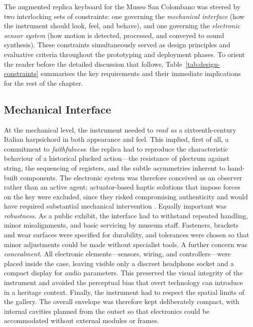 The augmented replica keyboard for the Museo San Colombano was steered by two interlocking sets of constraints: one governing the \emph{mechanical interface} (how the instrument should look, feel, and behave), and one governing the \emph{electronic sensor system} (how motion is detected, processed, and conveyed to sound synthesis). These constraints simultaneously served as design principles and evaluative criteria throughout the prototyping and deployment phases. To orient the reader before the detailed discussion that follows, Table~\ref{tab:design-constraints} summarises the key requirements and their immediate implications for the rest of the chapter.

\subsection{Mechanical Interface}

At the mechanical level, the instrument needed to \emph{read as} a sixteenth-century Italian harpsichord in both appearance and feel. This implied, first of all, a commitment to \emph{faithfulness}: the replica had to reproduce the characteristic behaviour of a historical plucked action---the resistance of plectrum against string, the sequencing of registers, and the subtle asymmetries inherent to hand-built components. The electronic system was therefore conceived as an observer rather than an active agent; actuator-based haptic solutions that impose forces on the key were excluded, since they risked compromising authenticity and would have required substantial mechanical intervention \cite{gillespie_haptic_1996,timmermans_multibody-based_2020}. Equally important was \emph{robustness}. As a public exhibit, the interface had to withstand repeated handling, minor misalignments, and basic servicing by museum staff. Fasteners, brackets and wear surfaces were specified for durability, and tolerances were chosen so that minor adjustments could be made without specialist tools. A further concern was \emph{concealment}. All electronic elements---sensors, wiring, and controllers---were placed inside the case, leaving visible only a discreet headphone socket and a compact display for audio parameters. This preserved the visual integrity of the instrument and avoided the perceptual bias that overt technology can introduce in a heritage context. Finally, the instrument had to respect the spatial limits of the gallery. The overall envelope was therefore kept deliberately compact, with internal cavities planned from the outset so that electronics could be accommodated without external modules or frames.


